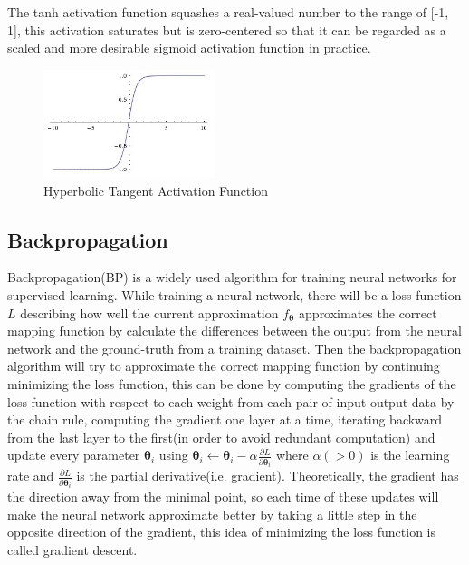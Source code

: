 \begin{itemize}
    The tanh activation function squashes a real-valued number to the range of [-1, 1], this activation
    saturates but is zero-centered so that it can be regarded as a scaled and more desirable sigmoid 
    activation function in practice.
    \begin{figure}[H]
        \begin{center}
        \includegraphics[width=5cm]{figures/tanh}
        \end{center}
        \caption{Hyperbolic Tangent Activation Function}
        \label{fig:tanh}
    \end{figure}
    
\end{itemize}

\subsection{Backpropagation}
Backpropagation(BP) is a widely used algorithm for training neural networks for
supervised learning. While training a neural network, there will be a loss function
$L$ describing how well the current approximation $f_{\boldsymbol{\theta}}$ approximates
the correct mapping function by calculate the differences between the output from the 
neural network and the ground-truth from a training dataset. Then the backpropagation algorithm 
will try to approximate the correct mapping function by continuing minimizing the loss function, 
this can be done by computing the gradients of the loss function with respect to 
each weight from each pair of input-output data by the chain rule, 
computing the gradient one layer at a time, iterating backward from the last layer to 
the first(in order to avoid redundant computation) and update every parameter 
${\boldsymbol{\theta}_{i}}$ using 
$\boldsymbol{\theta}_{i} \leftarrow \boldsymbol{\theta}_{i}-\alpha \frac{\partial L}{\partial \boldsymbol{\theta}_{i}}$
where $\alpha(>0)$ is the learning rate and $\frac{\partial L}{\partial \boldsymbol{\theta}_{i}}$ is the partial
derivative(i.e. gradient). Theoretically, the gradient has the direction away from the minimal point, 
so each time of these updates will make the neural network 
approximate better by taking a little step in the opposite direction of the gradient, this idea 
of minimizing the loss function is called gradient descent.

